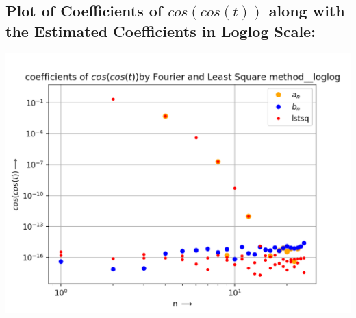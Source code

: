 \documentclass[10pt,english, openany]{book}
\begin{document}
\subsection{Plot of Coefficients of $cos(cos(t))$ along with the Estimated Coefficients  in Loglog Scale:}
{\centering\includegraphics[scale=0.7]{Figure_6.png}}
\end{document}
